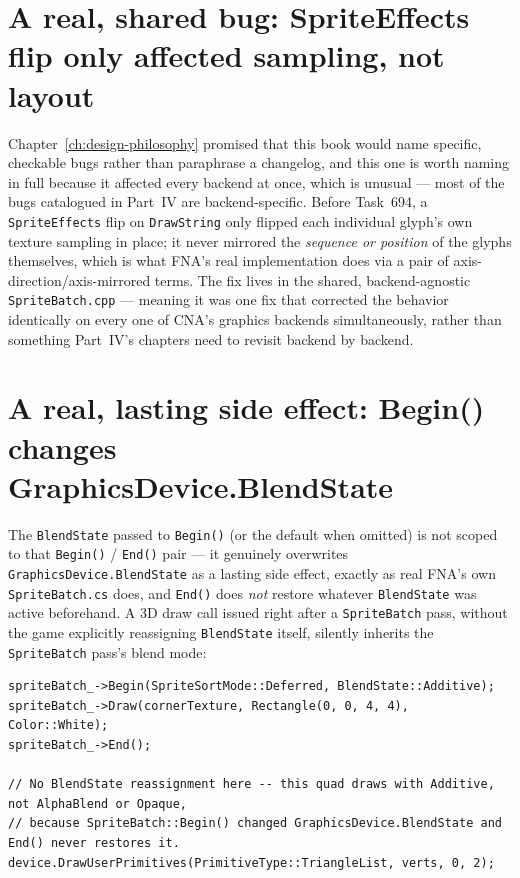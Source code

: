 \section{A real, shared bug: SpriteEffects flip only affected sampling, not layout}

Chapter~\ref{ch:design-philosophy} promised that this book would name specific, checkable
bugs rather than paraphrase a changelog, and this one is worth naming in full because it
affected every backend at once, which is unusual --- most of the bugs catalogued in Part~IV
are backend-specific. Before Task~694, a \texttt{SpriteEffects} flip on
\texttt{DrawString} only flipped each individual glyph's own texture sampling in place; it
never mirrored the \emph{sequence or position} of the glyphs themselves, which is what FNA's
real implementation does via a pair of axis-direction/axis-mirrored terms. The fix lives in
the shared, backend-agnostic \texttt{SpriteBatch.cpp} --- meaning it was one fix that
corrected the behavior identically on every one of CNA's graphics backends simultaneously,
rather than something Part~IV's chapters need to revisit backend by backend.

\section{A real, lasting side effect: Begin() changes GraphicsDevice.BlendState}
\label{sec:spritebatch-blendstate-leak}

The \texttt{BlendState} passed to \texttt{Begin()} (or the default 
when omitted) is not scoped to that \texttt{Begin()} / \texttt{End()} pair --- it genuinely
overwrites \texttt{GraphicsDevice.BlendState} as a lasting side effect, exactly as real FNA's
own \texttt{SpriteBatch.cs} does, and \texttt{End()} does \emph{not} restore whatever
\texttt{BlendState} was active beforehand. A 3D draw call issued right after a
\texttt{SpriteBatch} pass, without the game explicitly reassigning \texttt{BlendState} itself,
silently inherits the \texttt{SpriteBatch} pass's blend mode:

\begin{lstlisting}
spriteBatch_->Begin(SpriteSortMode::Deferred, BlendState::Additive);
spriteBatch_->Draw(cornerTexture, Rectangle(0, 0, 4, 4), Color::White);
spriteBatch_->End();

// No BlendState reassignment here -- this quad draws with Additive, not AlphaBlend or Opaque,
// because SpriteBatch::Begin() changed GraphicsDevice.BlendState and End() never restores it.
device.DrawUserPrimitives(PrimitiveType::TriangleList, verts, 0, 2);
\end{lstlisting}

